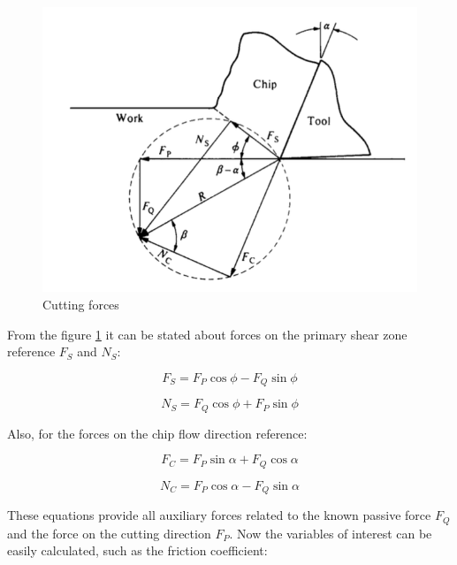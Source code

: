 	\begin{figure}[h]
		\centering
		\captionsetup{justification=centering}
		\includegraphics[scale=0.5]{Cap1/circlec.png}
		\caption{Cutting forces \cite{shaw2005metal}}
		\label{fig:circlec}
	\end{figure}

	From the figure \ref{fig:circlec} it can be stated about forces on the primary shear zone reference $F_{S}$ and $N_{S}$:

	\begin{equation} 
	\label{}
	F_{S} = F_{P}\cos\phi - F_{Q}\sin\phi
	\end{equation}

	\begin{equation} 
	\label{}
	N_{S} = F_{Q}\cos\phi + F_{P}\sin\phi
	\end{equation}

	Also, for the forces on the chip flow direction reference:

	\begin{equation} 
	\label{}
	F_{C} = F_{P}\sin\alpha + F_{Q}\cos\alpha
	\end{equation}

	\begin{equation} 
	\label{}
	N_{C} = F_{P}\cos\alpha - F_{Q}\sin\alpha
	\end{equation}

	These equations provide all auxiliary forces related to the known passive force $F_{Q}$ and the force on the cutting direction $F_{P}$. Now the variables of interest can be easily calculated, such as the friction coefficient:

